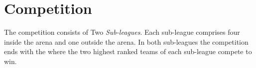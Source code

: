 \section{Competition}
The competition consists of Two \emph{Sub-leagues}.
Each sub-league comprises four  inside the arena and one  outside the arena.
In both sub-leagues the competition ends with the \FINAL{} where the two highest ranked teams of each sub-league compete to win.